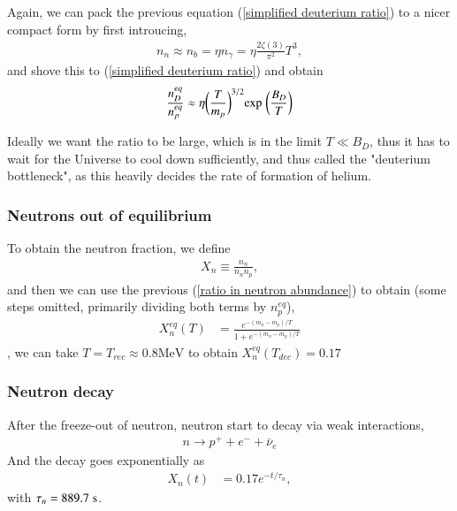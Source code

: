 \documentclass[a4paper, 12pt]{article}
\begin{document}
{{  Again, we can pack the previous equation (\ref{simplified deuterium
  ratio}) to a nicer compact form by first introucing, 
  \begin{align}
    \label{neutron number density in terms of gamma again}
    n_n \approx n_b = \eta n_{\gamma} = \eta \frac{2
    \zeta(3)}{\pi^2}T^3, 
  \end{align} and shove this to (\ref{simplified deuterium ratio})
  and obtain 
  \begin{align}
    \label{Deuterium Saha equation}
    \frac{n_{D}^{eq}}{n_{p}^{eq}} \approx \eta \bigg(\frac{T}{m_p}
    \bigg)^{3/2} \mathrm{exp} \hspace{0.1cm} \bigg( \frac{B_D}{T} \bigg) 
  \end{align}
  
  Ideally we want the ratio to be large, which is in the limit \( T \ll B_D
  \), thus it has to wait for the Universe to cool down
  sufficiently, and thus called the "deuterium bottleneck", as this
  heavily decides the rate of formation of helium.
  \subsubsection{Neutrons out of equilibrium}%
    \label{sub:Neutrons out of equilibrium}
    To obtain the neutron fraction, we define 
    \begin{align}
      \label{neutron fraction}
      X_{n} \equiv \frac{n_{n}}{n_{n} n_{p}}, 
    \end{align} and then we can use the previous (\ref{ratio in neutron
    abundance}) to obtain (some steps omitted, primarily dividing both
    terms by \( n_{p}^{eq} \)), 
    \begin{align}
      \label{final form for neutorn fraction}
      X_{n}^{eq}(T) &= \frac{e^{-(m_n - m_p)/T} }{1 + e^{-(m_n - m_p)/T} } 
    \end{align}, we can take \( T = T_{rec} \approx 0.8
    \mathrm{MeV} \) to obtain \( X_{n}^{eq}(T_{dec}) = 0.17 \)
    
    \subsubsection{Neutron decay}%
      \label{sub:Neutron decay}
      After the freeze-out of neutron, neutron start to decay via weak
      interactions, 
      \begin{align}
        \label{neutron decay}
        n \rightarrow p^+ + e^- + \bar{\nu}_{e}
      \end{align}
      And the decay goes exponentially as 
      \begin{align}
        \label{exponential decay of neutron}
        X_{n}(t) &=  0.17 e^{-t/\tau_n},
      \end{align} with \( \tau_{n} = 889.7 \hspace{0.1cm} \mathrm{s}
      \).


}}
\end{document}
